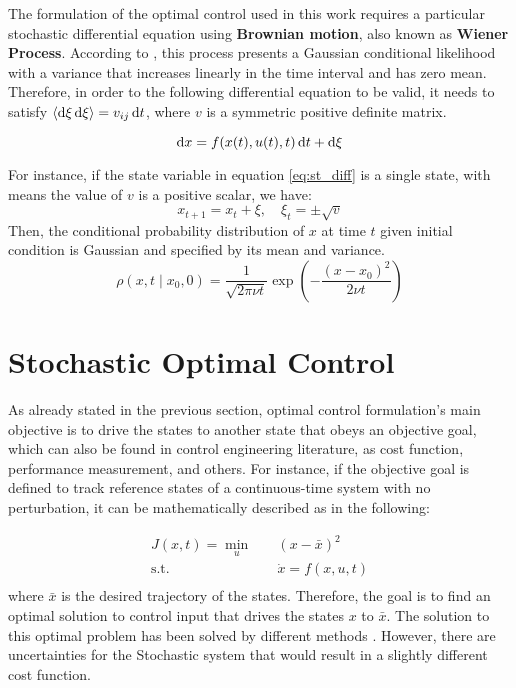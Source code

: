 \documentclass[]{hdsr}
\begin{document}
The formulation of the optimal control used in this work requires a particular stochastic differential equation using \textbf{Brownian motion}, also known as \textbf{Wiener Process}. According to \citep{kappen2011optimal}, this process presents a Gaussian conditional likelihood with a variance that increases linearly in the time interval and has zero mean. Therefore, in order to the following differential equation to be valid, it needs to satisfy $\langle\dif \xi \dif \xi \rangle = v_{ij}\dif t$, where $v$ is a symmetric positive definite matrix.

\begin{equation}
    \dif x = f(x(t),u(t),t)\dif t + \dif \xi
    \label{eq:st_diff}
\end{equation}

For instance, if the state variable in equation \ref{eq:st_diff} is a single state, with means the value of $v$ is a positive scalar, we have: 
\begin{equation}
    x_{t+1} = x_t + \xi, \quad \xi_t = \pm\sqrt{v}
    \label{eq:st_diff_1}
\end{equation}
Then, the conditional probability distribution of $x$ at time $t$ given initial condition is Gaussian and specified by its mean and variance. 
\begin{equation}
\rho\left(x, t \mid x_{0}, 0\right)=\frac{1}{\sqrt{2 \pi \nu t}} \exp \left(-\frac{\left(x-x_{0}\right)^{2}}{2 \nu t}\right)
\end{equation}


\section{Stochastic Optimal Control}
As already stated in the previous section, optimal control formulation's main objective is to drive the states to another state that obeys an objective goal, which can also be found in control engineering literature, as cost function, performance measurement, and others. For instance, if the objective goal is defined to track reference states of a continuous-time system with no perturbation, it can be mathematically described as in the following:

\begin{equation}
\begin{aligned}
J(x,t) = \min_{u} \quad & (x-\bar{x})^2\\
\textrm{s.t.} \quad & \dot{x}=f(x,u,t)\\
\end{aligned}
\end{equation}
where $\bar{x}$ is the desired trajectory of the states. Therefore, the goal is to find an optimal solution to control input that drives the states $x$ to $\bar{x}$. The solution to this optimal problem has been solved by different methods \citep{kirk2004optimal}. However, there are uncertainties for the Stochastic system that would result in a slightly different cost function. 
\end{document}
